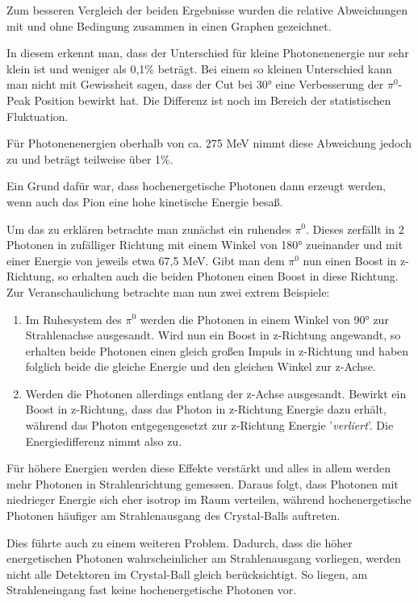\documentclass[a4paper,11pt,oneside,final,german,openbib,pdftex]{scrbook}
\begin{document}
{Zum besseren Vergleich der beiden Ergebnisse wurden die relative Abweichungen mit und ohne Bedingung zusammen in einen Graphen gezeichnet. 

In diesem erkennt man, dass der Unterschied f\"ur kleine Photonenenergie nur sehr klein ist und weniger als 0,1\% betr\"agt. Bei einem so kleinen Unterschied kann man nicht mit Gewissheit sagen, dass der Cut bei 30° eine Verbesserung der $\pi^0$-Peak Position bewirkt hat. Die Differenz ist noch im Bereich der statistischen Fluktuation. 

F\"ur Photonenenergien oberhalb von ca. 275 MeV nimmt diese Abweichung jedoch zu und betr\"agt teilweise \"uber 1\%.

Ein Grund daf\"ur war, dass hochenergetische Photonen dann erzeugt werden, wenn auch das Pion eine hohe kinetische Energie besa{\ss}. 

Um das zu erkl\"aren betrachte man zun\"achst ein ruhendes $\pi^0$. Dieses zerf\"allt in 2 Photonen in zuf\"alliger Richtung mit einem Winkel von 180° zueinander und mit einer Energie von jeweils etwa 67,5 MeV. Gibt man dem $\pi^0$ nun einen Boost in z-Richtung, so erhalten auch die beiden Photonen einen Boost in diese Richtung.
Zur Veranschaulichung betrachte man nun zwei extrem Beispiele:
\begin{enumerate}
	\item Im Ruhesystem des $\pi^0$ werden die Photonen in einem Winkel von 90° zur Strahlenachse ausgesandt. Wird nun ein Boost in z-Richtung angewandt, so erhalten beide Photonen einen gleich gro{\ss}en Impuls in z-Richtung und haben folglich beide die gleiche Energie und den gleichen Winkel zur z-Achse.
	\item Werden die Photonen allerdings entlang der z-Achse ausgesandt. Bewirkt ein Boost in z-Richtung, dass das Photon in z-Richtung Energie dazu erh\"alt, w\"ahrend das Photon entgegengesetzt zur z-Richtung Energie '\textit{verliert}'. Die Energiedifferenz nimmt also zu.
\end{enumerate}
F\"ur h\"ohere Energien werden diese Effekte verst\"arkt und alles in allem werden mehr Photonen in Strahlenrichtung gemessen. Daraus folgt, dass Photonen mit niedrieger Energie sich eher isotrop im Raum verteilen, w\"ahrend hochenergetische Photonen h\"aufiger am Strahlenausgang des Crystal-Balls auftreten.

Dies f\"uhrte auch zu einem weiteren Problem. Dadurch, dass die h\"oher energetischen Photonen wahrscheinlicher am Strahlenausgang vorliegen, werden nicht alle Detektoren im Crystal-Ball gleich ber\"ucksichtigt. So liegen, am Strahleneingang fast keine hochenergetische Photonen vor.

}
\end{document}
